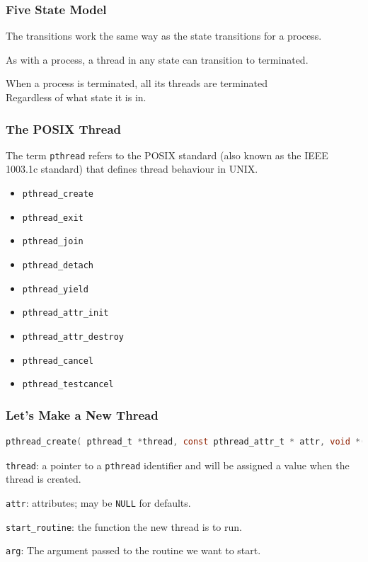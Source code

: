 \begin{frame}
\frametitle{Five State Model}

The transitions work the same way as the state transitions for a process. 

As with a process, a thread in any state can transition to terminated.

When a process is terminated, all its threads are terminated\\
\quad Regardless of what state it is in.


\end{frame}


\begin{frame}
\frametitle{The POSIX Thread}

The term \texttt{pthread} refers to the POSIX standard (also known as the IEEE 1003.1c standard) that defines thread behaviour in UNIX.

\begin{itemize}
	\item \texttt{pthread\_create}
	\item \texttt{pthread\_exit}
	\item \texttt{pthread\_join}
	\item \texttt{pthread\_detach}
	\item \texttt{pthread\_yield}
	\item \texttt{pthread\_attr\_init}
	\item \texttt{pthread\_attr\_destroy}
	\item \texttt{pthread\_cancel}
	\item \texttt{pthread\_testcancel}
\end{itemize}

\end{frame}


\begin{frame}[fragile]
\frametitle{Let's Make a New Thread}

\begin{lstlisting}[language=C]
pthread_create( pthread_t *thread, const pthread_attr_t * attr, void *(*start_routine)( void * ), void *arg );
\end{lstlisting}

\texttt{thread}: a pointer to a \texttt{pthread} identifier and will be assigned a value when the thread is created. 

\texttt{attr}: attributes; may be \texttt{NULL} for defaults.

\texttt{start\_routine}: the function the new thread is to run.

\texttt{arg}: The argument passed to the routine we want to start.

\end{frame}


